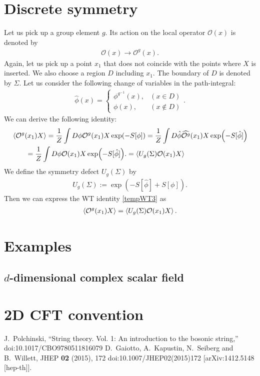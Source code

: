 \documentclass[12pt]{scrartcl}
\newcommand{\Ocal}{\mathcal{O}}
\newcommand{\phih}{\hat{\phi}}
\begin{document}
\section{Discrete symmetry}
Let us pick up a group element $g$. Its action on the local operator $\Ocal(x)$ is denoted by
\begin{align}
    \Ocal(x)\to \Ocal^g(x).
\end{align}
Again, let us pick up a point $x_1$ that does not coincide with the points where $X$ is inserted.  We also choose a region $D$ including $x_1$.  The boundary of $D$ is denoted by $\Sigma$.  Let us consider the following change of variables in the path-integral:
\begin{align}
    \phih(x)=
    \begin{cases}
        \phi^{g^{-1}}(x),& (x\in D)\\
        \phi(x),& (x\notin D)
    \end{cases}.
\end{align}
We can derive the following identity:
\begin{align}
    &\expval{\Ocal^{g}(x_1) X}
    =\frac{1}{Z}\int D\phi \Ocal^{g}(x_1) X \exp(-S[\phi])
    =\frac{1}{Z}\int D\phih \widehat{\Ocal^{g}}(x_1) X \exp(-S[\phih])\nonumber\\    
    &\qquad =\frac{1}{Z}\int D\phi \Ocal(x_1) X \exp(-S[\phih]).
    \label{tempWT3}
    =\expval{U_{g}(\Sigma)\Ocal(x_1)X}
\end{align}
We define the symmetry defect $U_{g}(\Sigma)$ by
\begin{align}
    U_{g}(\Sigma):=\exp(-S[\phih]+S[\phi]).
\end{align}
Then we can express the WT identity \eqref{tempWT3} as
\begin{align}
    \expval{\Ocal^{g}(x_1)X}
    =\expval{U_{g}(\Sigma)\Ocal(x_1)X}.
\end{align}

\section{Examples}
\subsection{$d$-dimensional complex scalar field}


\section{2D CFT convention}



\begin{thebibliography}{9}
J.~Polchinski,
``String theory. Vol. 1: An introduction to the bosonic string,''
doi:10.1017/CBO9780511816079
D.~Gaiotto, A.~Kapustin, N.~Seiberg and B.~Willett,
JHEP \textbf{02} (2015), 172
doi:10.1007/JHEP02(2015)172
[arXiv:1412.5148 [hep-th]].
\end{thebibliography}
\end{document}
